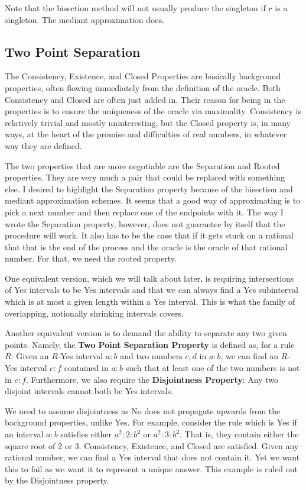 \documentclass[12pt]{article}
\theoremstyle{remark}
\begin{document}
Note that the bisection method will not usually produce the singleton if $r$ is a singleton. The mediant approximation does. 

\subsection{Two Point Separation}

The Consistency, Existence, and Closed Properties are basically background properties, often flowing immediately from the definition of the oracle. Both Consistency and Closed are often just added in. Their reason for being in the properties is to ensure the uniqueness of the oracle via maximality. Consistency is relatively trivial and mostly uninteresting, but the Closed property is, in many ways, at the heart of the promise and difficulties of real numbers, in whatever way they are defined. 

The two properties that are more negotiable are the Separation and Rooted properties. They are very much a pair that could be replaced with something else. I desired to highlight the Separation property because of the bisection and mediant approximation schemes. It seems that a good way of approximating is to pick a next number and then replace one of the endpoints with it. The way I wrote the Separation property, however, does not guarantee by itself that the procedure will work. It also has to be the case that if it gets stuck on a rational that that is the end of the process and the oracle is the oracle of that rational number. For that, we need the rooted property. 

One equivalent version, which we will talk about later, is requiring intersections of Yes intervals to be Yes intervals and that we can always find a Yes subinterval which is at most a given length within a Yes interval. This is what the family of overlapping, notionally shrinking intervals covers. 

Another equivalent version is to demand the ability to separate any two given points. Namely, the \textbf{Two Point Separation Property} is defined as, for a rule $R$: Given an $R$-Yes interval $a:b$ and two numbers $c,d$ in $a:b$, we can find an $R$-Yes interval $e:f$ contained in $a:b$ such that at least one of the two numbers is not in $e:f$. Furthermore, we also require the \textbf{Disjointness Property}: Any two disjoint intervals cannot both be Yes intervals. 

We need to assume disjointness as No does not propagate upwards from the background properties, unlike Yes. For example, consider the rule which is Yes if an interval $a:b$ satisfies either $a^2:2:b^2$ or $a^2:3:b^2$. That is, they contain either the square root of 2 or 3. Consistency, Existence, and Closed are satisfied. Given any rational number, we can find a Yes interval that does not contain it. Yet we want this to fail as we want it to represent a unique answer. This example is ruled out by the Disjointness property. 
\end{document}
